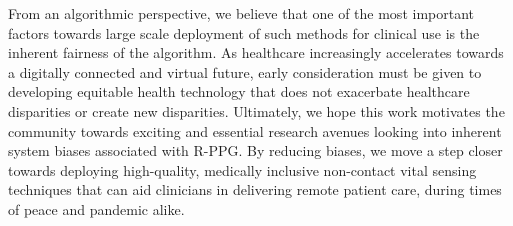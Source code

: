From an algorithmic perspective, we believe that one of the most important factors towards large scale deployment of such methods for clinical use is the inherent fairness of the algorithm. As healthcare increasingly accelerates towards a digitally connected and virtual future, early consideration must be given to developing equitable health technology that does not exacerbate healthcare disparities or create new disparities. Ultimately, we hope this work motivates the community towards exciting and essential research avenues looking into inherent system biases associated with R-PPG. By reducing biases, we move a step closer towards deploying high-quality, medically inclusive non-contact vital sensing techniques that can aid clinicians in delivering remote patient care, during times of peace and pandemic alike.



